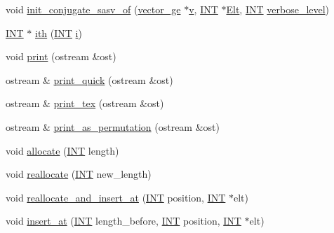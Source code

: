 \begin{DoxyCompactItemize}
\item 
void \mbox{\hyperlink{classvector__ge_a2fa34d332539c60df788fd5ad3926103}{init\+\_\+conjugate\+\_\+sasv\+\_\+of}} (\mbox{\hyperlink{classvector__ge}{vector\+\_\+ge}} $\ast$\mbox{\hyperlink{simeon_8_c_aeb3f3030944801b163bc3b829a7f6710}{v}}, \mbox{\hyperlink{galois_8h_a09fddde158a3a20bd2dcadb609de11dc}{I\+NT}} $\ast$\mbox{\hyperlink{simeon_8_c_aec1406935bdb1fee3561fcb840964100}{Elt}}, \mbox{\hyperlink{galois_8h_a09fddde158a3a20bd2dcadb609de11dc}{I\+NT}} \mbox{\hyperlink{simeon_8_c_a818073fbcc2f439e7c56952f67386122}{verbose\+\_\+level}})
\item 
\mbox{\hyperlink{galois_8h_a09fddde158a3a20bd2dcadb609de11dc}{I\+NT}} $\ast$ \mbox{\hyperlink{classvector__ge_a1ff002e8b746a9beb119d57dcd4a15ff}{ith}} (\mbox{\hyperlink{galois_8h_a09fddde158a3a20bd2dcadb609de11dc}{I\+NT}} \mbox{\hyperlink{alphabet2_8_c_acb559820d9ca11295b4500f179ef6392}{i}})
\item 
void \mbox{\hyperlink{classvector__ge_a0d260cce035c20b32d7989c50670aa8a}{print}} (ostream \&ost)
\item 
ostream \& \mbox{\hyperlink{classvector__ge_a07262bf7e62323977854b0884c85d549}{print\+\_\+quick}} (ostream \&ost)
\item 
ostream \& \mbox{\hyperlink{classvector__ge_a233bdafe653de7aa34994bd83e5e3299}{print\+\_\+tex}} (ostream \&ost)
\item 
ostream \& \mbox{\hyperlink{classvector__ge_ac62360340b6ad2484c121584465eeef2}{print\+\_\+as\+\_\+permutation}} (ostream \&ost)
\item 
void \mbox{\hyperlink{classvector__ge_a35b062a9201b30f0a87bf87702d243ae}{allocate}} (\mbox{\hyperlink{galois_8h_a09fddde158a3a20bd2dcadb609de11dc}{I\+NT}} length)
\item 
void \mbox{\hyperlink{classvector__ge_ab19fc29d1eaeca0daa2dd397819a701f}{reallocate}} (\mbox{\hyperlink{galois_8h_a09fddde158a3a20bd2dcadb609de11dc}{I\+NT}} new\+\_\+length)
\item 
void \mbox{\hyperlink{classvector__ge_af9a3fcffc74924aacdbd41c936750e9b}{reallocate\+\_\+and\+\_\+insert\+\_\+at}} (\mbox{\hyperlink{galois_8h_a09fddde158a3a20bd2dcadb609de11dc}{I\+NT}} position, \mbox{\hyperlink{galois_8h_a09fddde158a3a20bd2dcadb609de11dc}{I\+NT}} $\ast$elt)
\item 
void \mbox{\hyperlink{classvector__ge_afc62cf3c920b922450d27cbf4dae5af0}{insert\+\_\+at}} (\mbox{\hyperlink{galois_8h_a09fddde158a3a20bd2dcadb609de11dc}{I\+NT}} length\+\_\+before, \mbox{\hyperlink{galois_8h_a09fddde158a3a20bd2dcadb609de11dc}{I\+NT}} position, \mbox{\hyperlink{galois_8h_a09fddde158a3a20bd2dcadb609de11dc}{I\+NT}} $\ast$elt)

\end{DoxyCompactItemize}
